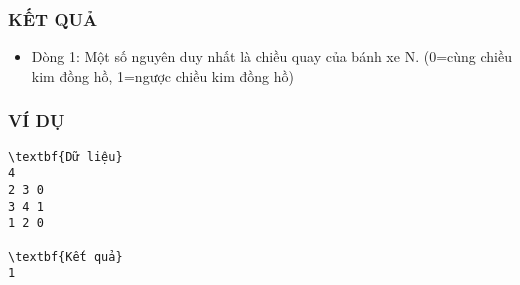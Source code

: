 \subsubsection{   KẾT QUẢ  }
\begin{itemize}
	\item     Dòng 1: Một số nguyên duy nhất là chiều quay của bánh xe N.         (0=cùng chiều kim đồng hồ, 1=ngược chiều kim đồng hồ)   
\end{itemize}

\subsubsection{   VÍ DỤ  }
\begin{verbatim}
\textbf{Dữ liệu}
4
2 3 0
3 4 1
1 2 0

\textbf{Kết quả}
1
\end{verbatim}
